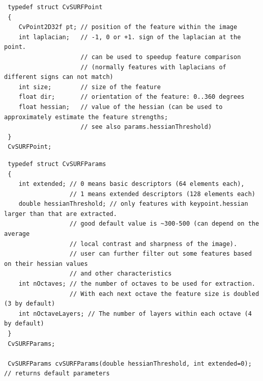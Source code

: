 \begin{description}
\begin{lstlisting}
 typedef struct CvSURFPoint
 {
    CvPoint2D32f pt; // position of the feature within the image
    int laplacian;   // -1, 0 or +1. sign of the laplacian at the point.
                     // can be used to speedup feature comparison
                     // (normally features with laplacians of different signs can not match)
    int size;        // size of the feature
    float dir;       // orientation of the feature: 0..360 degrees
    float hessian;   // value of the hessian (can be used to approximately estimate the feature strengths;
                     // see also params.hessianThreshold)
 }
 CvSURFPoint;
\end{lstlisting}
\begin{lstlisting}
 typedef struct CvSURFParams
 {
    int extended; // 0 means basic descriptors (64 elements each),
                  // 1 means extended descriptors (128 elements each)
    double hessianThreshold; // only features with keypoint.hessian larger than that are extracted.
                  // good default value is ~300-500 (can depend on the average
                  // local contrast and sharpness of the image).
                  // user can further filter out some features based on their hessian values
                  // and other characteristics
    int nOctaves; // the number of octaves to be used for extraction.
                  // With each next octave the feature size is doubled (3 by default)
    int nOctaveLayers; // The number of layers within each octave (4 by default)
 }
 CvSURFParams;

 CvSURFParams cvSURFParams(double hessianThreshold, int extended=0); // returns default parameters
\end{lstlisting}
\end{description}

